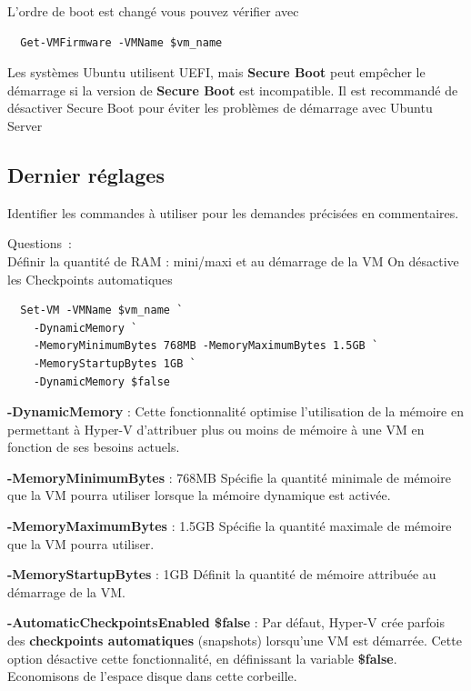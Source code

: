 \noindent L'ordre de boot est changé vous pouvez vérifier avec

\begin{verbatim}
  Get-VMFirmware -VMName $vm_name
\end{verbatim}

\noindent Les systèmes Ubuntu utilisent UEFI, mais \textbf{Secure Boot} peut empêcher le démarrage si la version de \textbf{Secure Boot} est incompatible. Il est recommandé de désactiver Secure Boot pour éviter les problèmes de démarrage avec Ubuntu Server

\subsection*{Dernier réglages}
{}
\noindent Identifier les commandes à utiliser pour les demandes précisées en commentaires.

\vspace{0.5cm}

Questions~: \\
Définir la quantité de RAM : mini/maxi et au démarrage de la VM
On désactive les Checkpoints automatiques

\begin{verbatim}
  Set-VM -VMName $vm_name `
    -DynamicMemory `
    -MemoryMinimumBytes 768MB -MemoryMaximumBytes 1.5GB `
    -MemoryStartupBytes 1GB `
    -DynamicMemory $false
\end{verbatim}

\noindent \textbf{-DynamicMemory} : Cette fonctionnalité optimise l'utilisation de la mémoire en permettant à Hyper-V d'attribuer plus ou moins de mémoire à une VM en fonction de ses besoins actuels.

\noindent \textbf{-MemoryMinimumBytes} : 768MB Spécifie la quantité minimale de mémoire que la VM pourra utiliser lorsque la mémoire dynamique est activée.

\noindent \textbf{-MemoryMaximumBytes} : 1.5GB Spécifie la quantité maximale de mémoire que la VM pourra utiliser.

\noindent \textbf{-MemoryStartupBytes} : 1GB Définit la quantité de mémoire attribuée au démarrage de la VM.

\noindent \textbf{-AutomaticCheckpointsEnabled \$false} : Par défaut, Hyper-V crée parfois des \textbf{checkpoints automatiques} (snapshots) lorsqu'une VM est démarrée. Cette option désactive cette fonctionnalité, en définissant la variable \textbf{\$false}. Economisons de l'espace disque dans cette corbeille.

